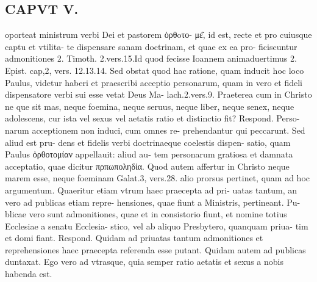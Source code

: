 \documentclass{article}
\begin{document}
\begin{pages}
\section*{CAPVT  V. }
\marginpar{[ p.249 ]}\pstart oporteat ministrum verbi Dei et pastorem ὀρθoτο- με͂, id est, recte et pro cuiusque captu et vtilita- te dispensare sanam doctrinam, et quae ex ea pro- ficiscuntur admonitiones 2. Timoth. 2.vers.15.Id quod fecisse Ioannem animaduertimus 2. Epist. cap,2, vers. 12.13.14. Sed obstat quod hac ratione, quam inducit hoc loco Paulus, videtur haberi et praescribi acceptio personarum, quam in vero et fideli dispensatore verbi sui esse vetat Deus Ma- lach.2.vers.9. Praeterea cum in Christo ne que sit mas, neque foemina, neque seruus, neque liber, neque senex, neque adolescens, cur ista vel sexus vel aetatis ratio et distinctio fit? Respond. Perso- narum acceptionem non induci, cum omnes re- prehendantur qui peccarunt. Sed aliud est pru- dens et fidelis verbi doctrinaeque coelestis dispen- satio, quam Paulus ὀρθοτομίαν appellauit: aliud au- tem personarum gratiosa et damnata acceptatio, quae dicitur πρπωποληδία. Quod autem affertur in Christo neque marem esse, neque foeminam Galat.3, vers.28. alio prorsus pertinet, quam ad hoc argumentum. Quaeritur etiam vtrum haec praecepta ad pri- uatas tantum, an vero ad publicas etiam repre- hensiones, quae fiunt a Ministris, pertineant. Pu- blicae vero sunt admonitiones, quae et in consistorio fiunt, et nomine totius Ecclesiae a senatu Ecclesia- stico, vel ab aliquo Presbytero, quanquam priua- tim et domi fiant. Respond. Quidam ad priuatas tantum admonitiones et reprehensiones haec praecepta referenda esse putant. Quidam autem ad publicas duntaxat. Ego vero ad vtrasque, quia semper ratio aetatis et sexus a nobis habenda est.  \pend

\end{pages}
\end{document}
